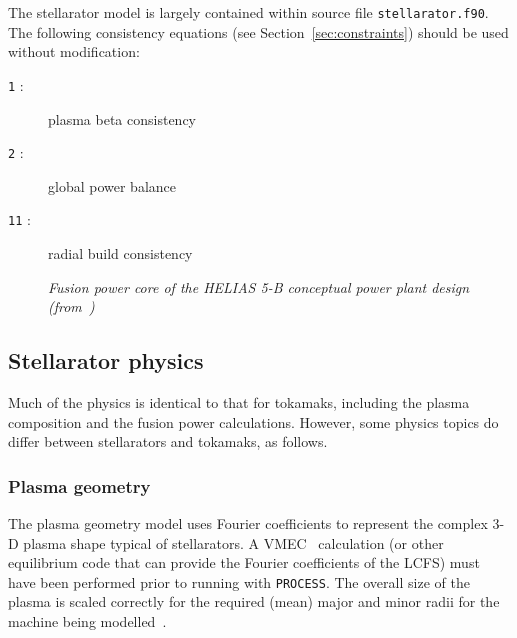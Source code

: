 \documentclass[11pt,a4paper]{report}
\newcommand{\process}{\mbox{\texttt{PROCESS}}}
\begin{document}
The stellarator model is largely contained within source file
\texttt{stellarator.f90}. The following consistency equations (see
Section~\ref{sec:constraints}) should be used without modification:
\begin{description}
\item [\texttt{1} :] plasma beta consistency
\item [\texttt{2} :] global power balance
\item [\texttt{11} :] radial build consistency
\end{description}

\begin{figure}[tbph]
\centerline{}
\caption[HELIAS 5-B Stellarator Power Plant Design]
{\label{fig:helias5b}
  \textit{Fusion power core of the HELIAS 5-B conceptual power plant design
    (from~\cite{helias5b})}
}
\end{figure}

\subsection{Stellarator physics}

Much of the physics is identical to that for tokamaks, including the plasma
composition and the fusion power calculations. However, some physics topics do
differ between stellarators and tokamaks, as follows.

\subsubsection{Plasma geometry}

The plasma geometry model uses Fourier coefficients to represent the complex
3-D plasma shape typical of stellarators. A VMEC~\cite{vmec} calculation (or
other equilibrium code that can provide the Fourier coefficients of the LCFS)
must have been performed prior to running with \process. The overall size of
the plasma is scaled correctly for the required (mean) major and minor radii
for the machine being modelled~\cite{geiger}.
\end{document}
